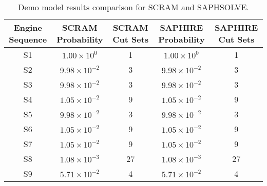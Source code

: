 \begin{table}[htbp]
    \centering
    \caption{Demo model results comparison for SCRAM and SAPHSOLVE.}
    \label{tab:mef_results_comparison}
    \begin{tabular}{|c|c|c|c|c|}
        \hline
        \textbf{Engine Sequence} & \textbf{SCRAM Probability} & \textbf{SCRAM Cut Sets} & \textbf{SAPHIRE Probability} & \textbf{SAPHIRE Cut Sets} \\
        \hline
        S1 & $1.00 \times 10^{0}$ & 1 & $1.00 \times 10^{0}$ & 1 \\
        S2 & $9.98 \times 10^{-2}$ & 3 & $9.98 \times 10^{-2}$ & 3 \\
        S3 & $9.98 \times 10^{-2}$ & 3 & $9.98 \times 10^{-2}$ & 3 \\
        S4 & $1.05 \times 10^{-2}$ & 9 & $1.05 \times 10^{-2}$ & 9 \\
        S5 & $9.98 \times 10^{-2}$ & 3 & $9.98 \times 10^{-2}$ & 3 \\
        S6 & $1.05 \times 10^{-2}$ & 9 & $1.05 \times 10^{-2}$ & 9 \\
        S7 & $1.05 \times 10^{-2}$ & 9 & $1.05 \times 10^{-2}$ & 9 \\
        S8 & $1.08 \times 10^{-3}$ & 27 & $1.08 \times 10^{-3}$ & 27 \\
        S9 & $5.71 \times 10^{-2}$ & 4 & $5.71 \times 10^{-2}$ & 4 \\
        \hline
    \end{tabular}
\end{table}